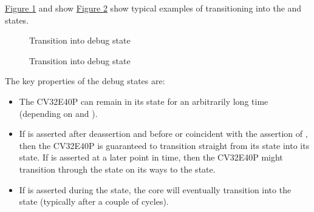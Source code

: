\documentclass[letterpaper,10pt,english]{sphinxmanual}
\begin{document}
\sphinxAtStartPar
\hyperref[\detokenize{debug:debug-running}]{Figure \ref{\detokenize{debug:debug-running}}} and show \hyperref[\detokenize{debug:debug-halted}]{Figure \ref{\detokenize{debug:debug-halted}}} show typical examples of transitioning into the  and  states.

\begin{figure}[htbp]
\centering
\capstart

\noindent{}
\caption{Transition into debug  state}\label{\detokenize{debug:debug-running}}\end{figure}

\begin{figure}[htbp]
\centering
\capstart

\noindent{}
\caption{Transition into debug  state}\label{\detokenize{debug:debug-halted}}\end{figure}

\sphinxAtStartPar
The key properties of the debug states are:
\begin{itemize}
\item {} 
\sphinxAtStartPar
The CV32E40P can remain in its  state for an arbitrarily long time (depending on  and ).

\item {} 
\sphinxAtStartPar
If  is asserted after  deassertion and before or coincident with the assertion of , then the CV32E40P
is guaranteed to transition straight from its  state into its  state. If  is asserted at a later
point in time, then the CV32E40P might transition through the  state on its ways to the  state.

\item {} 
\sphinxAtStartPar
If  is asserted during the  state, the core will eventually transition into the  state (typically after a couple of cycles).

\end{itemize}
\end{document}
